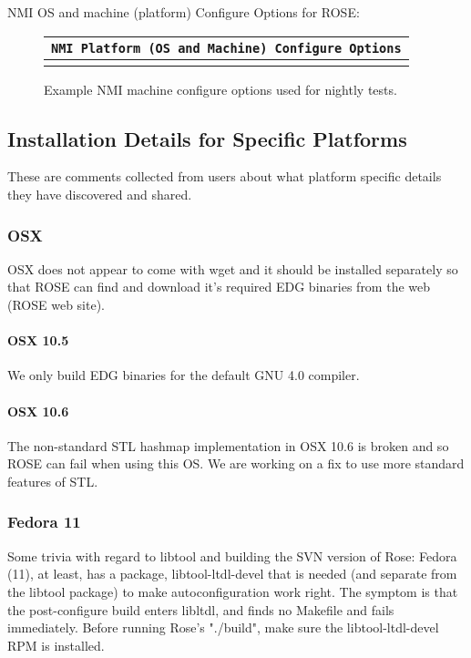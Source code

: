    NMI OS and machine (platform) Configure Options for ROSE:
{\indent
\begin{latexonly}
\begin{figure}[tb]
\begin{center}
\begin{tabular}{|c|} \hline
     {\tt NMI Platform (OS and Machine) Configure Options}
\\\hline\hline
{
\scriptsize
   
}
\\\hline
\end{tabular}
\end{center}
\caption{ Example NMI machine configure options used for nightly tests. }
\end{figure}
\end{latexonly}
\label{NMI:configureOptions}
}

\subsection{Installation Details for Specific Platforms}

   These are comments collected from users about what 
platform specific details they have discovered and shared.

\subsubsection{OSX}
   OSX does not appear to come with wget and it should be installed
separately so that ROSE can find and download it's required EDG 
binaries from the web (ROSE web site).

\paragraph{OSX 10.5}
   We only build EDG binaries for the default GNU 4.0 compiler.

\paragraph{OSX 10.6}
   The non-standard STL hashmap implementation in OSX 10.6 is broken and so ROSE
can fail when using this OS.  We are working on a fix to use more standard
features of STL.

\subsubsection{Fedora 11}
   Some trivia with regard to libtool and building the SVN version of Rose:
Fedora (11), at least, has a package, libtool-ltdl-devel that is needed (and separate from
the libtool package) to make autoconfiguration work right.  The symptom is that the
post-configure build enters libltdl, and finds no Makefile and fails immediately.
Before running Rose's "./build", make sure the libtool-ltdl-devel RPM is installed.

